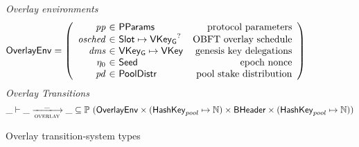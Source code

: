 \begin{figure}
  \emph{Overlay environments}
  \begin{equation*}
    \OverlayEnv =
    \left(
      \begin{array}{r@{~\in~}lr}
        \var{pp} & \PParams & \text{protocol parameters} \\
        \var{osched} & \Slot\mapsto\VKeyGen^? & \text{OBFT overlay schedule} \\
        \var{dms} & \VKeyGen\mapsto\VKey & \text{genesis key delegations} \\
        \eta_0 & \Seed & \text{epoch nonce} \\
        \var{pd} & \PoolDistr & \text{pool stake distribution} \\
      \end{array}
    \right)
  \end{equation*}
  \emph{Overlay Transitions}
  \begin{equation*}
    \_ \vdash \var{\_} \trans{overlay}{\_} \var{\_} \subseteq
    \powerset (\OverlayEnv \times (\HashKey_{pool} \mapsto \N) \times \BHeader \times
    (\HashKey_{pool} \mapsto \N))
  \end{equation*}
  \caption{Overlay transition-system types}
  \label{fig:ts-types:overlay}
\end{figure}

